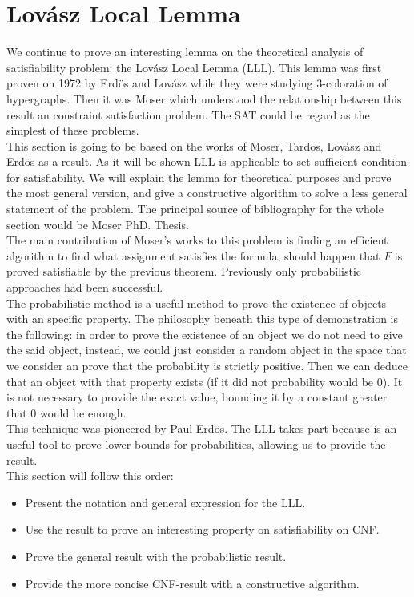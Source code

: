 \section{Lovász Local Lemma}
We continue to prove an interesting lemma on the theoretical analysis of satisfiability problem: the Lovász Local Lemma (LLL). This lemma was first proven on 1972 by Erdös and Lovász while they were studying 3-coloration of hypergraphs. Then it was Moser which understood the relationship between  this result an constraint satisfaction problem. The SAT could be regard as the simplest of these problems. \\


 
This section is going to be based on the works of Moser, Tardos, Lovász and Erdös as a result. As it will be shown LLL is applicable to set sufficient condition for satisfiability.  We will explain the lemma for theoretical purposes and prove the most general version, and give a constructive algorithm to solve a less general statement of the problem. The principal source of bibliography for the whole section would be Moser PhD. Thesis. \\ 


The main contribution of Moser's works to this problem is finding an efficient algorithm to find what assignment satisfies the formula, should happen that $F$ is proved satisfiable by the previous theorem. Previously only probabilistic approaches had been successful.\\


The probabilistic method is a useful method to prove the existence of objects with an specific property. The philosophy beneath this type of demonstration is the following: in order to prove the existence of an object we do not need to give the said object, instead, we could just consider a random object in the space that we consider an prove that the probability is strictly positive. Then we can deduce that an object with that property exists (if it did not probability would be 0). It is not necessary to provide the exact value, bounding it by a constant greater that 0 would be enough. \\

This technique was pioneered by Paul Erdös. The LLL takes part because is an useful tool to prove lower bounds for probabilities, allowing us to provide the result.\\

This section will follow this order:
\begin{itemize}
	\item Present the notation and general expression for the LLL.
	\item Use the result to prove an interesting property on satisfiability on CNF.
	\item Prove the general result with the probabilistic result.
	\item Provide the more concise CNF-result with a constructive algorithm.
\end{itemize}



